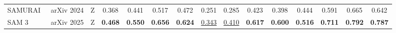 \begin{table}[t]
{\begin{tabular}{l l c cccc cccc cccc}
SAMURAI~\cite{yang2026samurai}     & arXiv 2024 & Z & 0.368             & 0.441             & 0.517             & 0.472             & 0.251             & 0.285             & 0.423             & 0.398             & 0.444             & 0.591             & 0.665             & 0.642             \\
SAM 3~\cite{carion2026sam3}       & arXiv 2025 & Z & \textbf{0.468}    & \textbf{0.550}    & \textbf{0.656}    & \textbf{0.624}    & \underline{0.343} & \underline{0.410} & \textbf{0.617}    & \textbf{0.600}    & \textbf{0.516}    & \textbf{0.711}    & \textbf{0.792}    & \textbf{0.787}    \\
\bottomrule
\end{tabular}
}
\end{table}